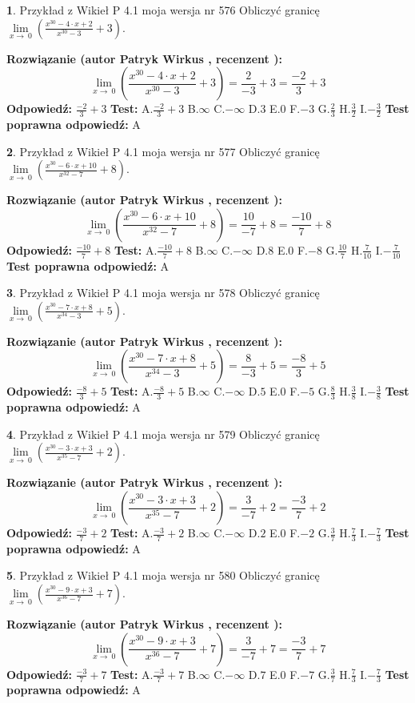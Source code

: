 \documentclass[12pt, a4paper]{article}
\theoremstyle{definition} %
\newtheorem{zad}{}
\newcommand{\zadStart}[1]{\begin{zad}#1\newline}
\newcommand{\zadStop}{\end{zad}}
\newcommand{\rozwStart}[2]{\noindent \textbf{Rozwiązanie (autor #1 , recenzent #2): }\newline}
\newcommand{\rozwStop}{\newline}
\newcommand{\odpStart}{\noindent \textbf{Odpowiedź:}\newline}
\newcommand{\odpStop}{\newline}
\newcommand{\testStart}{\noindent \textbf{Test:}\newline}
\newcommand{\testStop}{\newline}
\newcommand{\kluczStart}{\noindent \textbf{Test poprawna odpowiedź:}\newline}
\newcommand{\kluczStop}{\newline}
\begin{document}
\zadStart{Przykład z Wikieł P 4.1 moja wersja nr 576}
Obliczyć granicę $\lim\limits_{x\to\ 0}(\frac{x^{30}-4 \cdot x +2}{x^{30}-3}+3)$.
\zadStop
\rozwStart{Patryk Wirkus}{}
$$\lim\limits_{x\to\ 0}(\frac{x^{30}-4 \cdot x +2}{x^{30}-3}+3)=\frac{2}{-3}+3=\frac{-2}{3}+3$$
\rozwStop
\odpStart
$\frac{-2}{3}+3$
\odpStop
\testStart
A.$\frac{-2}{3}+3$
B.$\infty$
C.$-\infty$
D.$3$
E.$0$
F.$-3$
G.$\frac{2}{3}$
H.$\frac{3}{2}$
I.$-\frac{3}{2}$
\testStop
\kluczStart
A
\kluczStop



\zadStart{Przykład z Wikieł P 4.1 moja wersja nr 577}
Obliczyć granicę $\lim\limits_{x\to\ 0}(\frac{x^{30}-6 \cdot x +10}{x^{32}-7}+8)$.
\zadStop
\rozwStart{Patryk Wirkus}{}
$$\lim\limits_{x\to\ 0}(\frac{x^{30}-6 \cdot x +10}{x^{32}-7}+8)=\frac{10}{-7}+8=\frac{-10}{7}+8$$
\rozwStop
\odpStart
$\frac{-10}{7}+8$
\odpStop
\testStart
A.$\frac{-10}{7}+8$
B.$\infty$
C.$-\infty$
D.$8$
E.$0$
F.$-8$
G.$\frac{10}{7}$
H.$\frac{7}{10}$
I.$-\frac{7}{10}$
\testStop
\kluczStart
A
\kluczStop



\zadStart{Przykład z Wikieł P 4.1 moja wersja nr 578}
Obliczyć granicę $\lim\limits_{x\to\ 0}(\frac{x^{30}-7 \cdot x +8}{x^{34}-3}+5)$.
\zadStop
\rozwStart{Patryk Wirkus}{}
$$\lim\limits_{x\to\ 0}(\frac{x^{30}-7 \cdot x +8}{x^{34}-3}+5)=\frac{8}{-3}+5=\frac{-8}{3}+5$$
\rozwStop
\odpStart
$\frac{-8}{3}+5$
\odpStop
\testStart
A.$\frac{-8}{3}+5$
B.$\infty$
C.$-\infty$
D.$5$
E.$0$
F.$-5$
G.$\frac{8}{3}$
H.$\frac{3}{8}$
I.$-\frac{3}{8}$
\testStop
\kluczStart
A
\kluczStop



\zadStart{Przykład z Wikieł P 4.1 moja wersja nr 579}
Obliczyć granicę $\lim\limits_{x\to\ 0}(\frac{x^{30}-3 \cdot x +3}{x^{35}-7}+2)$.
\zadStop
\rozwStart{Patryk Wirkus}{}
$$\lim\limits_{x\to\ 0}(\frac{x^{30}-3 \cdot x +3}{x^{35}-7}+2)=\frac{3}{-7}+2=\frac{-3}{7}+2$$
\rozwStop
\odpStart
$\frac{-3}{7}+2$
\odpStop
\testStart
A.$\frac{-3}{7}+2$
B.$\infty$
C.$-\infty$
D.$2$
E.$0$
F.$-2$
G.$\frac{3}{7}$
H.$\frac{7}{3}$
I.$-\frac{7}{3}$
\testStop
\kluczStart
A
\kluczStop



\zadStart{Przykład z Wikieł P 4.1 moja wersja nr 580}
Obliczyć granicę $\lim\limits_{x\to\ 0}(\frac{x^{30}-9 \cdot x +3}{x^{36}-7}+7)$.
\zadStop
\rozwStart{Patryk Wirkus}{}
$$\lim\limits_{x\to\ 0}(\frac{x^{30}-9 \cdot x +3}{x^{36}-7}+7)=\frac{3}{-7}+7=\frac{-3}{7}+7$$
\rozwStop
\odpStart
$\frac{-3}{7}+7$
\odpStop
\testStart
A.$\frac{-3}{7}+7$
B.$\infty$
C.$-\infty$
D.$7$
E.$0$
F.$-7$
G.$\frac{3}{7}$
H.$\frac{7}{3}$
I.$-\frac{7}{3}$
\testStop
\kluczStart
A
\kluczStop
\end{document}
